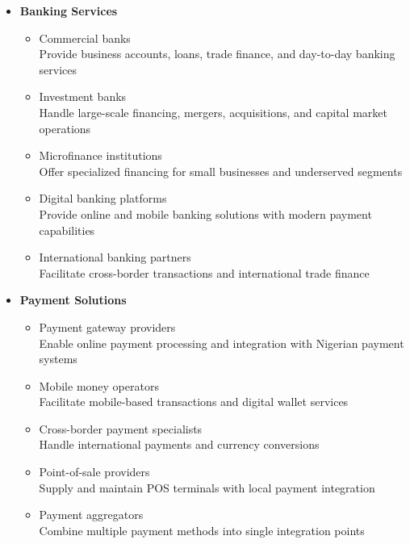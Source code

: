 \begin{tcolorbox}[
    colback=white,
    colframe=primarydark,
    title=\textbf{Financial Service Providers},
    before skip=1em,
    after skip=1em
]
    \begin{itemize}[leftmargin=*,itemsep=0.5em]
        \item \textbf{Banking Services}
        \begin{itemize}[itemsep=0.3em]
            \item Commercial banks \\
                \small{Provide business accounts, loans, trade finance, and day-to-day banking services}
            \item Investment banks \\
                \small{Handle large-scale financing, mergers, acquisitions, and capital market operations}
            \item Microfinance institutions \\
                \small{Offer specialized financing for small businesses and underserved segments}
            \item Digital banking platforms \\
                \small{Provide online and mobile banking solutions with modern payment capabilities}
            \item International banking partners \\
                \small{Facilitate cross-border transactions and international trade finance}
        \end{itemize}

        \vspace{0.5em}

        \item \textbf{Payment Solutions}
        \begin{itemize}[itemsep=0.3em]
            \item Payment gateway providers \\
                \small{Enable online payment processing and integration with Nigerian payment systems}
            \item Mobile money operators \\
                \small{Facilitate mobile-based transactions and digital wallet services}
            \item Cross-border payment specialists \\
                \small{Handle international payments and currency conversions}
            \item Point-of-sale providers \\
                \small{Supply and maintain POS terminals with local payment integration}
            \item Payment aggregators \\
                \small{Combine multiple payment methods into single integration points}
        \end{itemize}


\end{itemize}
\end{tcolorbox}
